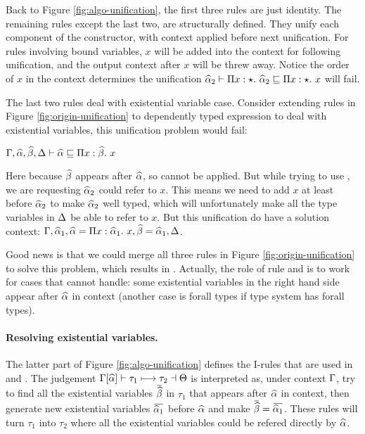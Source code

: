 Back to Figure \ref{fig:algo-unification}, the first three rules are just identity. The remaining rules except the last two, are structurally defined. They unify each component of the constructor, with context applied before next unification. For rules involving bound variables, $x$ will be added into the context for following unification, and the output context after $x$ will be threw away. Notice the order of $x$ in the context determines the unification $\widehat{\alpha}_2 \vdash \Pi x:\star.~ \widehat{\alpha}_2 \sqsubseteq \Pi x:\star.~ x$ will fail.

The last two rules deal with existential variable case. Consider extending rules in Figure \ref{fig:origin-unification} to dependently typed expression to deal with existential variables, this unification problem would fail:

$\Gamma, \widehat{\alpha}, \widehat{\beta}, \Delta \vdash \widehat{\alpha} \sqsubseteq \Pi x:\widehat{\beta}.~ x$

Here because $\widehat{\beta}$ appears after $\widehat{\alpha}$, so  cannot be applied. But while trying to use , we are requesting $\widehat{\alpha}_2$ could refer to  $x$. This means we need to add $x$ at least before $\widehat{\alpha}_2$ to make $\widehat{\alpha}_2$ well typed, which will unfortunately make all the type variables in $\Delta$ be able to refer to $x$. But this unification do have a solution context: $\Gamma, \widehat{\alpha}_1, \widehat{\alpha} = \Pi x:\widehat{\alpha}_1.~ x, \widehat{\beta} = \widehat{\alpha}_1, \Delta$.

Good news is that we could merge all three rules in Figure \ref{fig:origin-unification} to solve this problem, which results in . Actually, the role of rule  and  is to work for cases that  cannot handle: some existential variables in the right hand side appear after $\widehat{\alpha}$ in context (another case is forall types if type system has forall types).

\paragraph{Resolving existential variables.} The latter part of Figure \ref{fig:algo-unification} defines the I-rules that are used in  and . The judgement $\Gamma[\widehat{\alpha}] \vdash \tau_1 \longmapsto \tau_2 \dashv \Theta$ is interpreted as, under context $\Gamma$, try to find all the existential variables $\overbar \genB$ in $\tau_1$ that appears after $\widehat{\alpha}$ in context, then generate new existential variables $\overbar {\genA_1}$ before $\widehat{\alpha}$ and make $\overbar \genB = \overbar {\genA_1}$. These rules will turn $\tau_1$ into $\tau_2$ where all the existential variables could be refered directly by $\widehat{\alpha}$.

